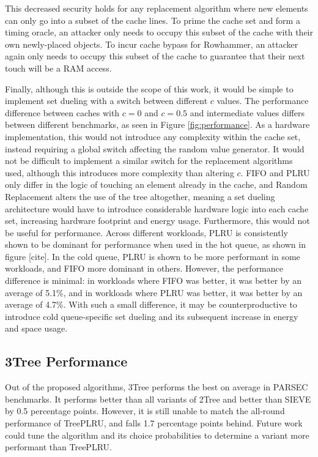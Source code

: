 \documentclass[letterpaper]{article}
\begin{document}
This decreased security holds for any replacement algorithm where new elements can only go
into a subset of the cache lines.
To prime the cache set and form a timing oracle,
an attacker only needs to occupy this subset of the cache with their own newly-placed objects.
To incur cache bypass for Rowhammer, an attacker again only needs to occupy this subset
of the cache to guarantee that their next touch will be a RAM access.

Finally, although this is outside the scope of this work,
it would be simple to implement set dueling with a switch between different $c$ values.
The performance difference between caches with $c=0$ and $c=0.5$ and intermediate values
differs between different benchmarks, as seen in Figure \ref{fig:performance}.
As a hardware implementation, this would not introduce any complexity within the cache set,
instead requiring a global switch affecting the random value generator.
It would not be difficult to implement a similar switch for the replacement algorithms used,
although this introduces more complexity than altering $c$.
FIFO and PLRU only differ in the logic of touching an element already in the cache,
and Random Replacement alters the use of the tree altogether,
meaning a set dueling architecture would have to introduce considerable hardware logic
into each cache set, increasing hardware footprint and energy usage.
Furthermore, this would not be useful for performance.
Across different workloads,
PLRU is consistently shown to be dominant for performance when used in the hot queue,
as shown in figure [cite].
In the cold queue, PLRU is shown to be more performant in some workloads,
and FIFO more dominant in others.
However, the performance difference is minimal:
in workloads where FIFO was better, it was better by an average of 5.1\%,
and in workloads where PLRU was better, it was better by an average of 4.7\%.
With such a small difference, it may be counterproductive to introduce cold queue-specific set dueling
and its subsequent increase in energy and space usage.

\subsection{3Tree Performance}


Out of the proposed algorithms, 3Tree performs the best on average in PARSEC benchmarks.
It performs better than all variants of 2Tree and better than SIEVE by 0.5 percentage points.
However, it is still unable to match the all-round performance of TreePLRU,
and falls 1.7 percentage points behind.
Future work could tune the algorithm and its choice probabilities to determine
a variant more performant than TreePLRU.
\end{document}
